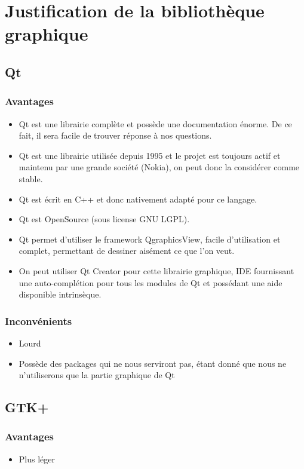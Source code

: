 \documentclass[a4paper]{report}
\begin{document}
\chapter{Justification de la bibliothèque graphique}
\section{Qt}
\subsection{Avantages}
\begin{itemize}
    \item Qt est une librairie complète et possède une documentation énorme. De ce fait, il sera facile de trouver réponse à nos questions.
    \item Qt est une librairie utilisée depuis 1995 et le projet est toujours actif et maintenu par une grande société (Nokia), on peut donc la considérer comme stable.
    \item Qt est écrit en C++ et donc nativement adapté pour ce langage.
    \item Qt est OpenSource (sous license GNU LGPL).
    \item Qt permet d'utiliser le framework QgraphicsView, facile d'utilisation et complet, permettant de dessiner aisément ce que l'on veut.
    \item On peut utiliser Qt Creator pour cette librairie graphique, IDE fournissant une auto-complétion pour tous les modules de Qt et possédant une aide disponible intrinsèque.
\end{itemize}
\subsection{Inconvénients}
\begin{itemize}
    \item Lourd
    \item Possède des packages qui ne nous serviront pas, étant donné que nous ne n'utiliserons que la partie graphique de Qt
\end{itemize}
\section{GTK+}
\subsection{Avantages}
\begin{itemize}
    \item Plus léger
\end{itemize}
\end{document}
